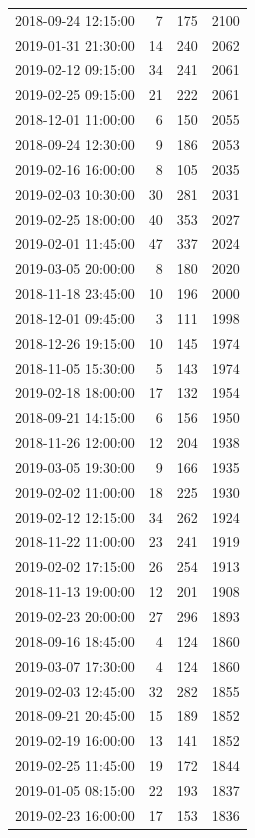 \begin{tabular}{lrrr}
2018-09-24 12:15:00 & 7 & 175 & 2100 \\
2019-01-31 21:30:00 & 14 & 240 & 2062 \\
2019-02-12 09:15:00 & 34 & 241 & 2061 \\
2019-02-25 09:15:00 & 21 & 222 & 2061 \\
2018-12-01 11:00:00 & 6 & 150 & 2055 \\
2018-09-24 12:30:00 & 9 & 186 & 2053 \\
2019-02-16 16:00:00 & 8 & 105 & 2035 \\
2019-02-03 10:30:00 & 30 & 281 & 2031 \\
2019-02-25 18:00:00 & 40 & 353 & 2027 \\
2019-02-01 11:45:00 & 47 & 337 & 2024 \\
2019-03-05 20:00:00 & 8 & 180 & 2020 \\
2018-11-18 23:45:00 & 10 & 196 & 2000 \\
2018-12-01 09:45:00 & 3 & 111 & 1998 \\
2018-12-26 19:15:00 & 10 & 145 & 1974 \\
2018-11-05 15:30:00 & 5 & 143 & 1974 \\
2019-02-18 18:00:00 & 17 & 132 & 1954 \\
2018-09-21 14:15:00 & 6 & 156 & 1950 \\
2018-11-26 12:00:00 & 12 & 204 & 1938 \\
2019-03-05 19:30:00 & 9 & 166 & 1935 \\
2019-02-02 11:00:00 & 18 & 225 & 1930 \\
2019-02-12 12:15:00 & 34 & 262 & 1924 \\
2018-11-22 11:00:00 & 23 & 241 & 1919 \\
2019-02-02 17:15:00 & 26 & 254 & 1913 \\
2018-11-13 19:00:00 & 12 & 201 & 1908 \\
2019-02-23 20:00:00 & 27 & 296 & 1893 \\
2018-09-16 18:45:00 & 4 & 124 & 1860 \\
2019-03-07 17:30:00 & 4 & 124 & 1860 \\
2019-02-03 12:45:00 & 32 & 282 & 1855 \\
2018-09-21 20:45:00 & 15 & 189 & 1852 \\
2019-02-19 16:00:00 & 13 & 141 & 1852 \\
2019-02-25 11:45:00 & 19 & 172 & 1844 \\
2019-01-05 08:15:00 & 22 & 193 & 1837 \\
2019-02-23 16:00:00 & 17 & 153 & 1836 \\

\end{tabular}

